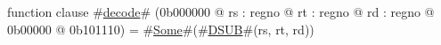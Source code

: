 function clause #\hyperref[zdecode]{decode}# (0b000000 @ rs : regno @ rt : regno @ rd : regno @ 0b00000 @ 0b101110) =
  #\hyperref[zSome]{Some}#(#\hyperref[zDSUB]{DSUB}#(rs, rt, rd))
